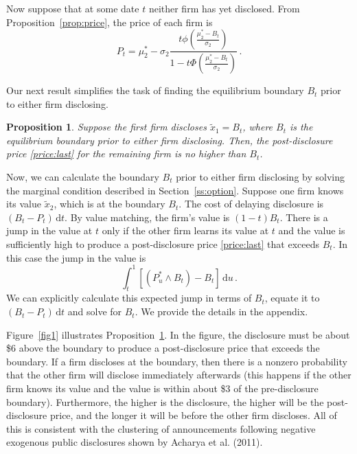 \documentclass[authoryear,letterpaper,english,12pt]{elsarticle}
\theoremstyle{plain}
\newtheorem{proposition}{Proposition}
\numberwithin{lemma}{section}
\numberwithin{proposition}{section}
\numberwithin{equation}{section}
\numberwithin{figure}{section}
\newcommand{\D}{\mathrm{d}}
\begin{document}
Now suppose that at some date $t$ neither firm has yet disclosed.  From Proposition~\ref{prop:price}, the price of each firm is
\begin{equation}
    P_t = \mu^*_2 - \sigma_2 \frac{t \phi\left(\frac{\mu^*_2 - B_t}{\sigma_2}\right)}
    {1 - t \Phi\left(\frac{\mu^*_2 - B_t}{\sigma_2}\right)}\,.
\end{equation}

Our next result simplifies the task of finding the equilibrium boundary $B_t$ prior to either firm disclosing.

\begin{proposition}\label{prop:keylemma}
Suppose the first firm discloses $\tilde x_1 = B_t$, where $B_t$ is the equilibrium boundary prior to either firm disclosing.  Then, the post-disclosure price \eqref{price:last} for the remaining firm is no higher than $B_t$.
\end{proposition}

Now, we can calculate the boundary $B_t$ prior to either firm disclosing by solving the marginal condition described in Section~\ref{ss:option}. 
Suppose one firm knows its value $\tilde x_2$, which is at the boundary $B_t$.  The cost of delaying disclosure is $(B_t-P_t)\,\D t$.  By value matching, the firm's value is $(1-t)B_t$.  There is a jump in the value at $t$ only if the other firm learns its value at $t$ and the value is sufficiently high to produce a post-disclosure price \eqref{price:last} that exceeds $B_t$.  In this case the jump in the value is
\begin{equation}
    \int_t^1 [(P^*_u \wedge B_t) - B_t]\,\D u\,.
\end{equation}
We can explicitly calculate this expected jump in terms of $B_t$, equate it to $(B_t-P_t)\,\D t$ and solve for $B_t$.  We provide the details in the appendix.

Figure~\ref{fig1} illustrates Proposition~\ref{prop:keylemma}.  In the figure, the disclosure must be about \$6 above the boundary to produce a post-disclosure price that exceeds the boundary.  If a firm discloses at the boundary, then there is a nonzero probability that the other firm will disclose immediately afterwards (this happens if the other firm knows its value and the value is within about \$3 of the pre-disclosure boundary).  Furthermore, the higher is the disclosure, the higher will be the post-disclosure price, and the longer it will be before the other firm discloses.  All of this is consistent with the clustering of announcements following negative exogenous public disclosures shown by Acharya et al. (2011). 
\end{document}
